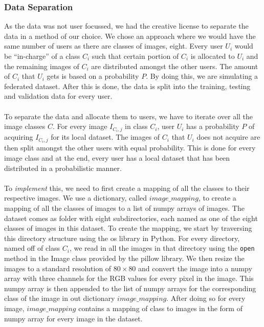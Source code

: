 \documentclass[12pt]{article}
\begin{document}
\subsubsection{Data Separation}
As the data was not user focussed, we had the creative license to separate the data in a method of our choice. We chose an approach where we would have the same number of users as there are classes of images, eight. Every user $U_i$ would be ``in-charge'' of a class $C_i$ such that certain portion of $C_i$ is allocated to $U_i$ and the remaining images of $C_i$ are distributed amongst the other users. The amount of $C_i$ that $U_i$ gets is based on a probability $P$. By doing this, we are simulating a federated dataset. After this is done, the data is split into the training, testing and validation data for every user.
\\\\
To separate the data and allocate them to users, we have to iterate over all the image classes $C$. For every image $I_{C_i, j}$ in class $C_i$, user $U_i$ has a probability $P$ of acquiring $I_{C_i, j}$ for its local dataset. The images of $C_i$ that $U_i$ does not acquire are then split amongst the other users with equal probability. This is done for every image class and at the end, every user has a local dataset that has been distributed in a probabilistic manner. 
\\\\
To \textit{implement} this, we need to first create a mapping of all the classes to their respective images. We use a dictionary, called $image\_mapping$, to create a mapping of all the classes of images to a list of numpy arrays of images. The dataset comes as folder with eight subdirectories, each named as one of the eight classes of images in this dataset. To create the mapping, we start by traversing this directory structure using the os library in Python. For every directory, named off of class $C_i$, we read in all the images in that directory using the \texttt{open} method in the Image class provided by the pillow library. We then resize the images to a standard resolution of $80 \times 80$ and convert the image into a numpy array with three channels for the RGB values for every pixel in the image. This numpy array is then appended to the list of numpy arrays for the corresponding class of the image in out dictionary $image\_mapping$. After doing so for every image, $image\_mapping$ contains a mapping of class to images in the form of numpy array for every image in the dataset.
\\\\
\end{document}
